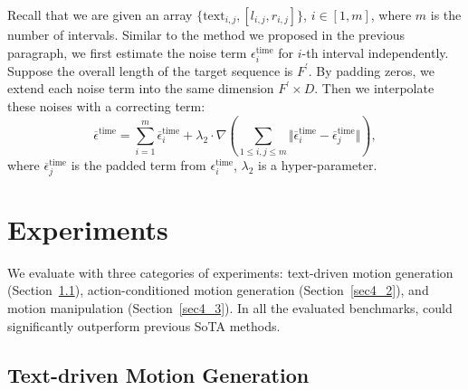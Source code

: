 Recall that we are given an array $\{\textrm{text}_{i,j}, [l_{i,j}, r_{i,j}]\}$, $i \in [1, m]$, where $m$ is the number of intervals. Similar to the method we proposed in the previous paragraph, we first estimate the noise term $\epsilon^{\textrm{time}}_i$ for $i$-th interval independently. Suppose the overall length of the target sequence is $F^{\prime}$. By padding zeros, we extend each noise term into the same dimension $F^{\prime} \times D$. Then we interpolate these noises with a correcting term:
\begin{equation}
\overline{\epsilon}^{\textrm{time}}=\sum_{i=1}^m \overline{\epsilon}^{\textrm{time}}_i + \lambda_2 \cdot \nabla ( \sum\limits_{1 \leq i,j \leq m} \Vert \overline{\epsilon}^{\textrm{time}}_i - \overline{\epsilon}^{\textrm{time}}_j  \Vert),
\end{equation}
where $\overline{\epsilon}^{\textrm{time}}_j$ is the padded term from $\epsilon^{\textrm{time}}_i$, $\lambda_2$ is a hyper-parameter.

\section{Experiments}\label{sec4}



We evaluate \name with three categories of experiments: 
text-driven motion generation (Section~\ref{sec4_1}), action-conditioned motion generation (Section~\ref{sec4_2}), 
and motion manipulation (Section~\ref{sec4_3}).
In all the evaluated benchmarks, \name could significantly outperform previous SoTA methods.

\subsection{Text-driven Motion Generation}\label{sec4_1}

